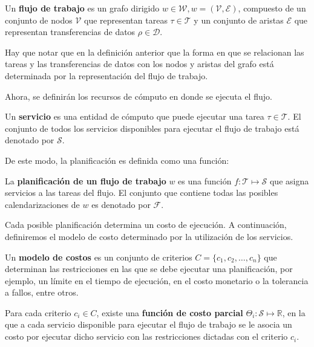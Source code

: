 \begin{defn}
Un \textbf{flujo de trabajo} es un grafo dirigido $w \in \mathcal{W}, w = (\mathcal{V},\mathcal{E})$, compuesto de un conjunto de nodos $\mathcal{V}$ que representan tareas $ \tau \in \mathcal{T}$ y un conjunto de aristas $\mathcal{E}$ que representan transferencias de datos $ \rho \in \mathcal{D}$.
\end{defn}

Hay que notar que en la definición anterior que la forma en que se relacionan las tareas y las transferencias de datos con los nodos y aristas del grafo está determinada por la representación del flujo de trabajo.

Ahora, se definirán los recursos de cómputo en donde se ejecuta el flujo. 

\begin{defn}
Un \textbf{servicio} es una entidad de cómputo que puede ejecutar una tarea $\tau \in \mathcal{T}$. El conjunto de todos los servicios disponibles para ejecutar el flujo de trabajo está denotado por $\mathcal{S}$.
\end{defn}

De este modo, la planificación es definida como una función:

\begin{defn}
La \textbf{planificación de un flujo de trabajo} $w$ es una función $ f: \mathcal{T} \mapsto \mathcal{S}$ que asigna servicios a las tareas del flujo. El conjunto que contiene todas las posibles calendarizaciones de $w$ es denotado por $\mathcal{F}$.
\end{defn}

Cada posible planificación determina un costo de ejecución. A continuación, definiremos el modelo de costo determinado por la utilización de los servicios.

\begin{defn}
Un \textbf{modelo de costos} es un conjunto de criterios $C = \{c_1, c_2, \dots, c_n\}$ que determinan las restricciones en las que se debe ejecutar una planificación, por ejemplo, un límite en el tiempo de ejecución, en el costo monetario o la tolerancia a fallos, entre otros.
\end{defn}

\begin{defn}
Para cada criterio $c_i \in C$, existe una \textbf{función de costo parcial} $\Theta_i : \mathcal{S} \mapsto \mathbb{R}$, en la que a cada servicio disponible para ejecutar el flujo de trabajo se le asocia un costo por ejecutar dicho servicio con las restricciones dictadas con el criterio $c_i$.
\end{defn}

